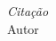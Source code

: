 
\chapter*{}
\vspace{15cm}
\begin{flushright}
	\textit
	{
		Citação
	}\medskip\\ 
	Autor
\end{flushright}